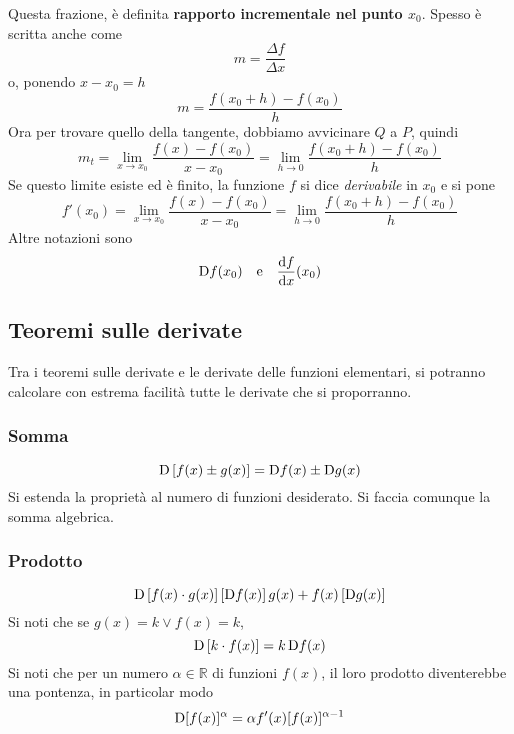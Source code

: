 Questa frazione, è definita \textbf{rapporto incrementale nel punto $x_0$}. Spesso è scritta anche
come 
\begin{equation*}
  m = \frac{\Delta f}{\Delta x}
\end{equation*}
o, ponendo $x-x_0 = h$
\begin{equation*}
  m = \frac{f(x_0+h)-f(x_0)}{h}
\end{equation*}
Ora per trovare quello della tangente, dobbiamo avvicinare $Q$ a $P$, quindi
\begin{equation*}
  m_t = \lim\limits_{x\to x_0} \frac{f(x)-f(x_0)}{x-x_0} = 
  \lim\limits_{h\to0} \frac{f(x_0+h)-f(x_0)}{h}
\end{equation*}
Se questo limite esiste ed è finito, la funzione $f$ si dice \emph{derivabile} in $x_0$ e si pone
\begin{equation*}
  f'(x_0) = \lim\limits_{x\to x_0} \frac{f(x)-f(x_0)}{x-x_0} = 
  \lim\limits_{h\to0} \frac{f(x_0+h)-f(x_0)}{h}
\end{equation*}
Altre notazioni sono
\begin{equation*}
  \mathop{}\!\mathrm{D} f(x_0)\quad\text{e}\quad \frac{\mathop{}\!\mathrm{d} f}{\mathop{}\!\mathrm{d} x}(x_0)
\end{equation*}

\subsection{Teoremi sulle derivate}
Tra i teoremi sulle derivate e le derivate delle funzioni elementari, si potranno calcolare con
estrema facilità tutte le derivate che si proporranno.

\subsubsection{Somma}
\begin{equation*}
  \mathop{}\!\mathrm{D} \left[ f(x)\pm g(x) \right] = \mathop{}\!\mathrm{D} f(x)\pm\mathop{}\!\mathrm{D} g(x)
\end{equation*}
Si estenda la proprietà al numero di funzioni desiderato. Si faccia comunque la somma algebrica.

\subsubsection{Prodotto}
\begin{equation*}
  \mathop{}\!\mathrm{D} \left[ f(x)\cdot g(x) \right] \left[ \mathop{}\!\mathrm{D} f(x) \right]g(x) + f(x)\left[ \mathop{}\!\mathrm{D} g(x) \right]
\end{equation*}
Si noti che se $g(x) = k\lor f(x) = k$,
\begin{equation*}
  \mathop{}\!\mathrm{D} \left[ k\cdot f(x) \right] = k\mathop{}\!\mathrm{D} f(x)
\end{equation*}
Si noti che per un numero $\alpha\in\mathbb{R}$ di funzioni $f(x)$, il loro prodotto diventerebbe
una pontenza, in particolar modo
\begin{equation*}
  \mathop{}\!\mathrm{D}[f(x)]^\alpha = \alpha f'(x)[f(x)]^{\alpha-1}
\end{equation*}

